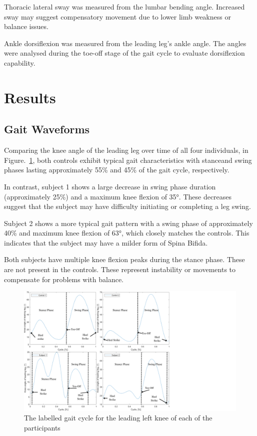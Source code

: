 \documentclass[conference]{IEEEtran}
\begin{document}
Thoracic lateral sway was measured from the lumbar bending angle. Increased sway may suggest compensatory movement due to lower limb weakness or balance issues.

Ankle dorsiflexion was measured from the leading leg's ankle angle. The angles were analysed during the toe-off stage of the gait cycle to evaluate dorsiflexion capability.

\section{Results}\label{results}

\subsection{Gait Waveforms}

Comparing the knee angle of the leading leg over time of all four individuals, in Figure.~\ref{fig:Gaitcollage}, both controls exhibit typical gait characteristics with stanceand swing phases lasting approximately 55\% and 45\% of the gait cycle, respectively.

In contrast, subject 1 shows a large decrease in swing phase duration (approximately 25\%) and a maximum knee flexion of 35°. These decreases suggest that the subject may have difficulty initiating or completing a leg swing.

Subject 2 shows a more typical gait pattern with a swing phase of approximately 40\% and maximum knee flexion of 63°, which closely matches the controls. This indicates that the subject may have a milder form of Spina Bifida.

Both subjects have multiple knee flexion peaks during the stance phase. These are not present in the controls. These represent instability or movements to compensate for problems with balance.


\begin{figure}[h]
\centering
\includegraphics[width=14cm]{Gait cycle collage.png}
\caption{The labelled gait cycle for the leading left knee of each of the participants}
\label{fig:Gaitcollage} %
\end{figure}
\end{document}
